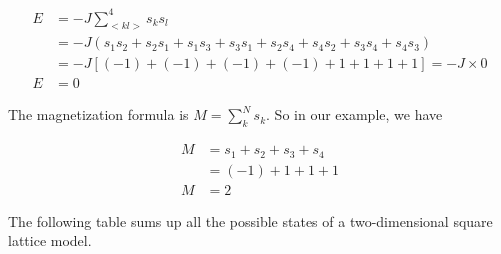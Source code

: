 \documentclass[a4paper, twoside, 11pt]{report}
\theoremstyle{theorem}
\theoremstyle{remark}
\theoremstyle{exemple}
\begin{document}
                \begin{align*}
                    E &= -J \sum\limits_{<kl>}^{4}s_ks_l \\
                      &= -J (s_1s_2 + s_2s_1 + s_1s_3 + s_3s_1 + s_2s_4 + s_4s_2 + s_3s_4 + s_4s_3) \\
                      &= -J \left[(-1) + (-1) + (-1) + (-1) + 1 + 1 + 1 + 1\right] = -J \times 0 \\
                    E &= 0 
                \end{align*}
                
            The magnetization formula is $\displaystyle M = \sum\limits_{k}^{N} s_k$. So in our example, we have 
                
                \begin{align*}
                    M &= s_1 + s_2 + s_3 + s_4 \\
                      &= (-1) + 1 + 1 + 1 \\
                    M &= 2
                \end{align*}
            
            The following table sums up all the possible states of a two-dimensional square lattice model.
            
\end{document}
